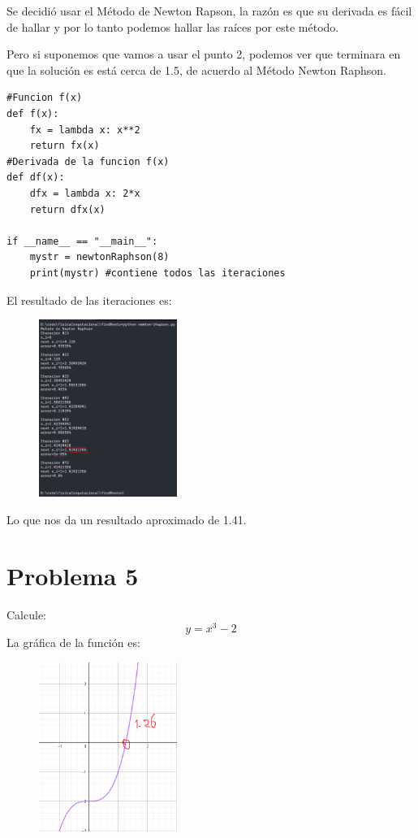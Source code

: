 \documentclass[a4paper,12pt]{article}
\begin{document}
    Se decidió usar 
    el Método de Newton Rapson, la razón es que su derivada es fácil 
    de hallar y por lo tanto
    podemos hallar las raíces por este método.

    Pero si suponemos que vamos a usar el punto 2, podemos ver que terminara en 
    que la solución es está cerca de 1.5, de acuerdo al Método Newton Raphson.


\begin{lstlisting}
#Funcion f(x)
def f(x):
    fx = lambda x: x**2
    return fx(x)
#Derivada de la funcion f(x)
def df(x):
    dfx = lambda x: 2*x
    return dfx(x)

if __name__ == "__main__":
    mystr = newtonRaphson(8)
    print(mystr) #contiene todos las iteraciones
\end{lstlisting}
\newpage    
El resultado de las iteraciones es:
    \begin{figure}[h]
        \centering
        \includegraphics[width=0.4\textwidth]{f4console.PNG}
    \end{figure}

Lo que nos da un resultado aproximado de 1.41.
    \newpage
    \section{Problema 5}
    Calcule:
    \begin{equation}
        y = x^3 - 2
    \end{equation}
    La gráfica de la función es:
    \begin{figure}[h]
        \centering
        \includegraphics[width=0.4\textwidth]{f5.PNG}
    \end{figure}
\end{document}

